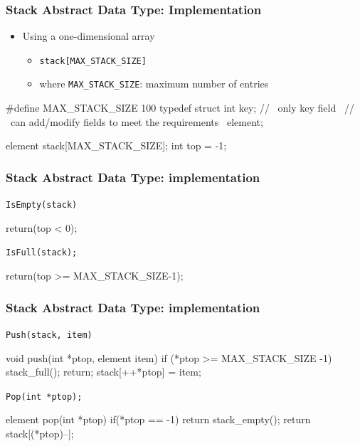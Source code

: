 \documentclass[newPxFont,sthlmFooter,nooffset]{beamer}
\begin{document}
\begin{frame}[t, fragile]
  \frametitle{Stack Abstract Data Type: Implementation}
  \begin{itemize}
  \item Using a one-dimensional array
    \begin{itemize}
    \item \texttt{stack[MAX\_STACK\_SIZE]}
    \item where \texttt{MAX\_STACK\_SIZE}: maximum number of entries
    \end{itemize}
  \end{itemize}
\begin{ncodedef}
#define MAX_STACK_SIZE  100
typedef struct {
    int key; // ~only key field~
             // ~can add/modify fields to meet the requirements~
} element;

element stack[MAX_STACK_SIZE];
int top = -1;
\end{ncodedef}
\end{frame}


\begin{frame}[t, fragile]
  \frametitle{Stack Abstract Data Type: implementation}
\texttt{IsEmpty(stack)}
  \begin{codedef}
    return(top < 0);
  \end{codedef}

\texttt{IsFull(stack);}

  \begin{codedef}
    return(top >= MAX\_STACK\_SIZE-1);
  \end{codedef}

\end{frame}


\begin{frame}[t, fragile]
  \frametitle{Stack Abstract Data Type: implementation}
\texttt{Push(stack, item)}

  \begin{codedef}
void push(int *ptop, element item){
    if (*ptop >= MAX_STACK_SIZE -1) {
       stack_full();
       return;
    }
    stack[++*ptop] = item;    
}
  \end{codedef}


\texttt{Pop(int *ptop);}

  \begin{codedef}
element pop(int *ptop){
    if(*ptop == -1)
        return stack_empty();
    return stack[(*ptop)--];
}
  \end{codedef}

\end{frame}
\end{document}
